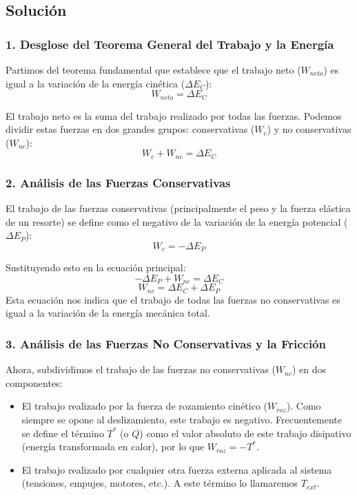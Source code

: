 \documentclass[12pt, a4paper]{article}
\begin{document}
\subsection*{Solución}

\subsubsection*{1. Desglose del Teorema General del Trabajo y la Energía}
Partimos del teorema fundamental que establece que el trabajo neto ($W_{neto}$) es igual a la variación de la energía cinética ($\Delta E_C$):
$$W_{neto} = \Delta E_C$$

El trabajo neto es la suma del trabajo realizado por todas las fuerzas. Podemos dividir estas fuerzas en dos grandes grupos: conservativas ($W_c$) y no conservativas ($W_{nc}$):
$$W_c + W_{nc} = \Delta E_C$$

\subsubsection*{2. Análisis de las Fuerzas Conservativas}
El trabajo de las fuerzas conservativas (principalmente el peso y la fuerza elástica de un resorte) se define como el negativo de la variación de la energía potencial ($\Delta E_P$):
$$W_c = -\Delta E_P$$

Sustituyendo esto en la ecuación principal:
$$-\Delta E_P + W_{nc} = \Delta E_C$$
$$W_{nc} = \Delta E_C + \Delta E_P$$
Esta ecuación nos indica que el trabajo de todas las fuerzas no conservativas es igual a la variación de la energía mecánica total.

\subsubsection*{3. Análisis de las Fuerzas No Conservativas y la Fricción}
Ahora, subdividimos el trabajo de las fuerzas no conservativas ($W_{nc}$) en dos componentes: 
\begin{itemize}
    \item El trabajo realizado por la fuerza de rozamiento cinético ($W_{roz}$). Como siempre se opone al deslizamiento, este trabajo es negativo. Frecuentemente se define el término $T^*$ (o $Q$) como el valor absoluto de este trabajo disipativo (energía transformada en calor), por lo que $W_{roz} = -T^*$.
    \item El trabajo realizado por cualquier otra fuerza externa aplicada al sistema (tensiones, empujes, motores, etc.). A este término lo llamaremos $T_{ext}$.
\end{itemize}
\end{document}
